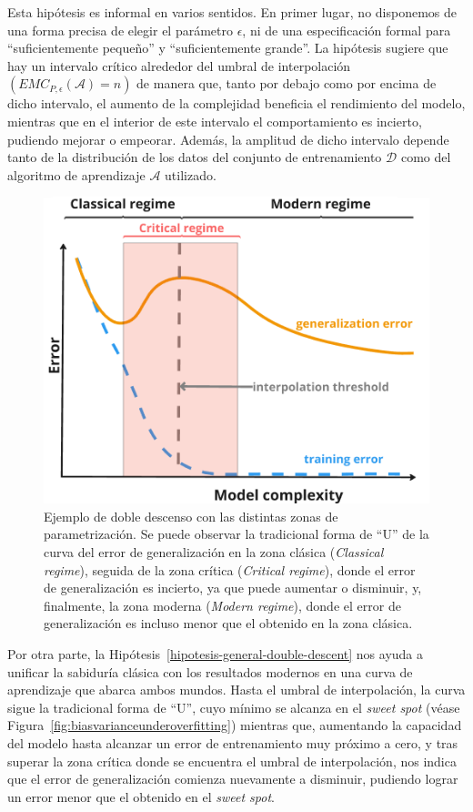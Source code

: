 Esta hipótesis es informal en varios sentidos. En primer lugar, no disponemos de una forma precisa de elegir el parámetro $\epsilon$, ni de una especificación formal para ``suficientemente pequeño'' y ``suficientemente grande''. La hipótesis sugiere que hay un intervalo crítico alrededor del umbral de interpolación $(EMC_{P, \epsilon}(\mathcal{A}) = n)$ de manera que, tanto por debajo como por encima de dicho intervalo, el aumento de la complejidad beneficia el rendimiento del modelo, mientras que en el interior de este intervalo el comportamiento es incierto, pudiendo mejorar o empeorar. Además, la amplitud de dicho intervalo depende tanto de la distribución de los datos del conjunto de entrenamiento $\mathcal{D}$ como del algoritmo de aprendizaje $\mathcal{A}$ utilizado.

\begin{figure}[h]
    \centering
    \includegraphics[width=0.6\linewidth]{img/planteamiento-teorico-dd.png}
    \caption[Ejemplo de doble descenso con las distintas zonas de parametrización.]{Ejemplo de doble descenso con las distintas zonas de parametrización. Se puede observar la tradicional forma de ``U'' de la curva del error de generalización en la zona clásica (\textit{Classical regime}), seguida de la zona crítica (\textit{Critical regime}), donde el error de generalización es incierto, ya que puede aumentar o disminuir, y, finalmente, la zona moderna (\textit{Modern regime}), donde el error de generalización es incluso menor que el obtenido en la zona clásica.}\label{fig:planteamiento-teorico-dd.png}
\end{figure}

Por otra parte, la Hipótesis~\ref{hipotesis-general-double-descent} nos ayuda a unificar la sabiduría clásica con los resultados modernos en una curva de aprendizaje que abarca ambos mundos. Hasta el umbral de interpolación, la curva sigue la tradicional forma de ``U'', cuyo mínimo se alcanza en el \textit{sweet spot} (véase Figura~\ref{fig:biasvarianceunderoverfitting}) mientras que, aumentando la capacidad del modelo hasta alcanzar un error de entrenamiento muy próximo a cero, y tras superar la zona crítica donde se encuentra el umbral de interpolación, nos indica que el error de generalización comienza nuevamente a disminuir, pudiendo lograr un error menor que el obtenido en el \textit{sweet spot}.


